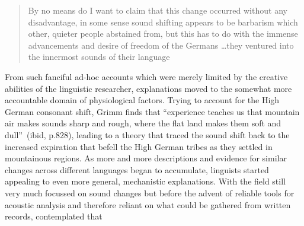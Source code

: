 
\begin{quote}
By no means do I want to claim that this change occurred without any disadvantage, in some sense sound shifting appears to be barbarism which other, quieter people abstained from, but this has to do with the immense advancements and desire of freedom of the Germans \ldots they ventured into the innermost sounds of their language~\citep[p.417, own translation]{Grimm1848}
\end{quote}

From such fanciful ad-hoc accounts which were merely limited by the creative abilities of the linguistic researcher,
explanations moved to the somewhat more accountable domain of physiological factors. Trying to account for the High German consonant shift, Grimm finds that ``experience teaches us that mountain air makes sounds sharp and rough, where the flat land makes them soft and dull''~(ibid, p.828), leading to a theory that traced the sound shift back to the increased expiration that befell the High German tribes as they settled in mountainous regions. As more and more descriptions and evidence for similar changes across different languages began to accumulate, linguists started appealing to even more general, mechanistic explanations.
With the field still very much focussed on sound changes but before the advent of reliable tools for acoustic analysis and therefore reliant on what could be gathered from written records, \citet{Jespersen1922} contemplated that

